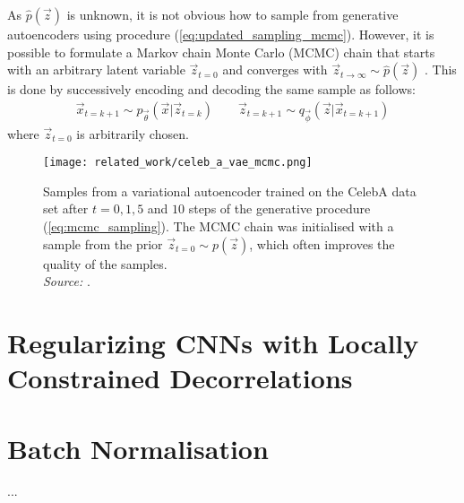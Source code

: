 As $\hat{p}(\vec{z})$ is unknown, it is not obvious how to sample from generative autoencoders using procedure (\ref{eq:updated_sampling_mcmc}). However, it is possible to formulate a Markov chain Monte Carlo (MCMC) chain that starts with an arbitrary latent variable $\vec{z}_{t=0}$ and converges with $\vec{z}_{t \rightarrow \infty} \sim \hat{p}(\vec{z})$ \cite{Creswell2016}. This is done by successively encoding and decoding the same sample as follows:
\begin{align}
\vec{x}_{t=k+1} \sim p_{\vec{\theta}}(\vec{x} | \vec{z}_{t=k}) \quad\quad \vec{z}_{t=k+1} \sim q_{\vec{\phi}}(\vec{z} | \vec{x}_{t=k+1})
\label{eq:mcmc_sampling}
\end{align}
where $\vec{z}_{t=0}$ is arbitrarily chosen.

\begin{figure}[H]
\centering
\captionsetup{justification=centering}
\texttt{[image: related\_work/celeb\_a\_vae\_mcmc.png]}
\caption{Samples from a variational autoencoder trained on the CelebA data set after $t = 0, 1, 5$ and $10$ steps of the generative procedure (\ref{eq:mcmc_sampling}). The MCMC chain was initialised with a sample from the prior $\vec{z}_{t=0} \sim p(\vec{z})$, which often improves the quality of the samples.\\ \textit{Source:} \cite{Creswell2016}.}
\label{fig:mcmc_sampling}
\end{figure}



%
%
%
%
%
\section{Regularizing CNNs with Locally Constrained Decorrelations}
\cite{Rodriguez2016}




%
%
%
%
%
\section{Batch Normalisation}
...